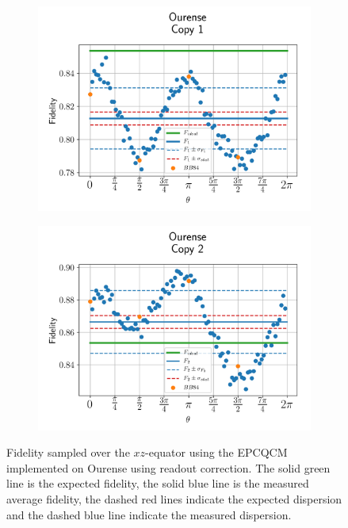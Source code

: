 \begin{figure}[H]
  \centering
  \begin{subfigure}{.5\textwidth}
    \centering
    \includegraphics[width=\textwidth]{Figures/Economical/IBM/OnlyEquator/results_ourense_copy1.png}
    \label{fig:epc_uncorrected_ourense_equator_1}
  \end{subfigure}%
  \begin{subfigure}{.5\textwidth}
    \centering
    \includegraphics[width=\textwidth]{Figures/Economical/IBM/OnlyEquator/results_ourense_copy2.png}
    \label{fig:epc_uncorrected_ourense_equator_2}
  \end{subfigure}
  \vspace{-0.5cm}
  \caption{Fidelity sampled over the $xz$-equator using the EPCQCM implemented on Ourense using readout correction. The solid green line is the expected fidelity, the solid blue line is the measured average fidelity, the dashed red lines indicate the expected dispersion and the dashed blue line indicate the measured dispersion.}
  \label{fig:epc_uncorrected_ourense_equator}
\end{figure}

